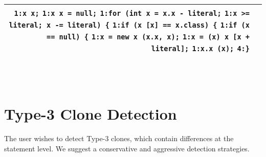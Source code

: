 \documentclass[]{article}
\begin{document}
\begin{minipage}{\textwidth}
\begin{tabular}{rp{12.5cm}}
			\verb|1:x x;|\newline
			\verb|1:x x = null;|\newline
			\verb|1:for (int x = x.x - literal;|\newline
			\verb|1:x >= literal; x -= literal) {|\newline
			\verb|1:if (x [x] == x.class) {|\newline
			\verb|1:if (x == null) {|\newline
			\verb|1:x = new x (x.x, x);|\newline
			\verb|1:x = (x) x [x + literal];|\newline
			\verb|1:x.x (x);|\newline
			\verb|4:}| \\
			\bottomrule[2pt]
		\end{tabular}
	\end{minipage}\\\\

	\newpage
	\section{Type-3 Clone Detection}
	The user wishes to detect Type-3 clones, which contain differences at the statement level.  We suggest a conservative and aggressive detection strategies.
	
\end{document}
